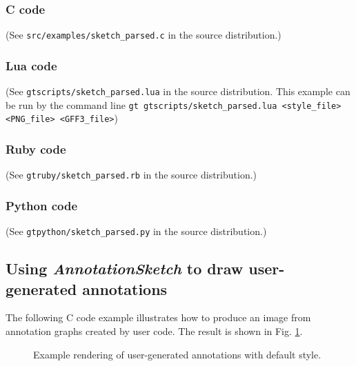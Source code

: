 \documentclass[a4paper]{scrreprt}
\begin{document}
\subsubsection{C code}
(See \texttt{src/examples/sketch\_parsed.c} in the source distribution.)

\subsubsection{Lua code}
(See \texttt{gtscripts/sketch\_parsed.lua} in the source distribution. This example can be run by the command line \texttt{gt gtscripts/sketch\_parsed.lua <style\_file> <PNG\_file> <GFF3\_file>})

\subsubsection{Ruby code}
(See \texttt{gtruby/sketch\_parsed.rb} in the source distribution.)

\subsubsection{Python code}
(See \texttt{gtpython/sketch\_parsed.py} in the source distribution.)


\subsection{Using \emph{AnnotationSketch} to draw user-generated annotations}
The following C code example illustrates how to produce an image from annotation graphs created by user code.
 The result is shown in Fig. \ref{constructed_img}.

\begin{figure}
\caption{Example rendering of user-generated annotations with default style.}
\label{constructed_img}
\end{figure}
\end{document}
